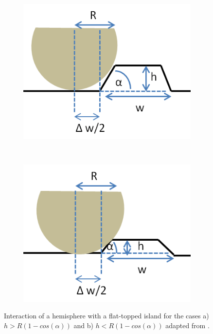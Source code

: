 \begin{figure}[h]
	\begin{subfigure}[t]{0.4\textwidth}
		\centering
		\includegraphics[width = 1\textwidth]{Figs/Ch2/afm1.png}
		\caption{}
	\end{subfigure}%
	\hspace*{1cm}
	~	
	\begin{subfigure}[t]{0.4\textwidth}
		\centering
		\includegraphics[width=1\textwidth]{Figs/Ch2/afm2.png}
		\caption{}
	\end{subfigure}
	\caption {Interaction of a hemisphere with a flat-topped island for the cases a) $h > R(1-cos(\alpha))$ and b) $h < R(1-cos(\alpha))$ adapted from \cite{Oliver2008}. }
	\label{2.3}
\end{figure}
\FloatBarrier 

